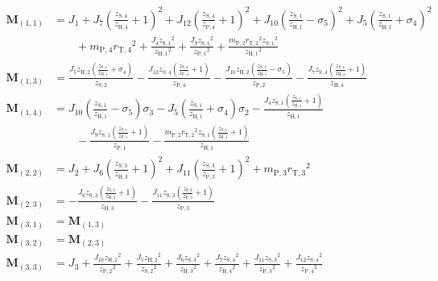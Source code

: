 \begin{align*}
	\pmb{M}_{(1,1)} &=  J_1+J_7\left(\frac{z_\mathrm{S,4}}{z_\mathrm{H,4}}+1\right)^2+J_{12} \left(\frac{z_\mathrm{S,4}}{z_\mathrm{P,4}}+1\right)^2+J_{10} {\left(\frac{z_\mathrm{S,1}}{z_\mathrm{H,1}} - \sigma_{5}\right)}^2+J_{5} \left(\frac{z_\mathrm{S,1}}{z_\mathrm{H,1}}+\sigma_{4}\right)^2 \\
		&\qquad + m_\mathrm{P,4} {r_\mathrm{T,4}}^2+\frac{J_{4} {z_\mathrm{S,1}}^2}{{z_\mathrm{H,1}}^2}+\frac{J_{9} {z_\mathrm{S,1}}^2}{{z_\mathrm{P,1}}^2}+\frac{m_\mathrm{P,2} {r_\mathrm{T,2}}^2 {z_\mathrm{S,1}}^2}{{z_\mathrm{H,1}}^2}\\
	\pmb{M}_{(1,3)} &= \frac{J_{5} z_\mathrm{H,2} \left(\frac{z_\mathrm{S,1}}{z_\mathrm{H,1}}+\sigma_{4}\right)}{z_\mathrm{S,2}}-\frac{J_{12} z_\mathrm{S,4} \left(\frac{z_\mathrm{S,4}}{z_\mathrm{P,4}}+1\right)}{z_\mathrm{P,4}}-\frac{J_{10} z_\mathrm{H,2} \left(\frac{z_\mathrm{S,1}}{z_\mathrm{H,1}} - \sigma_{5}\right)}{z_\mathrm{P,2}}-\frac{J_{7} z_\mathrm{S,4} \left(\frac{z_\mathrm{S,4}}{z_\mathrm{H,4}}+1\right)}{z_\mathrm{H,4}}\\
	\pmb{M}_{(1,4)} &= J_{10} \left(\frac{z_\mathrm{S,1}}{z_\mathrm{H,1}}-\sigma_{5}\right) \sigma_{3} - J_{5} \left(\frac{z_\mathrm{S,1}}{z_\mathrm{H,1}}+\sigma_{4}\right) \sigma_{2} -\frac{J_{4} z_\mathrm{S,1} \left(\frac{z_\mathrm{S,1}}{z_\mathrm{H,1}}+1\right)}{z_\mathrm{H,1}}\\
		&\qquad-\frac{J_{9} z_\mathrm{S,1} \left(\frac{z_\mathrm{S,1}}{z_\mathrm{P,1}}+1\right)}{z_\mathrm{P,1}}-\frac{m_\mathrm{P,2} {r_\mathrm{T,2}}^2 z_\mathrm{S,1} \left(\frac{z_\mathrm{S,1}}{z_\mathrm{H,1}}+1\right)}{z_\mathrm{H,1}}\\
	\pmb{M}_{(2,2)} &= J_2+J_6 \left(\frac{z_\mathrm{S,3}}{z_\mathrm{H,3}}+1\right)^2+J_{11} \left(\frac{z_\mathrm{S,3}}{z_\mathrm{P,3}}+1\right)^2+m_\mathrm{P,3} {r_\mathrm{T,3}}^2\\
	\pmb{M}_{(2,3)} &= -\frac{J_{6} z_\mathrm{S,3} \left(\frac{z_\mathrm{S,3}}{z_\mathrm{H,3}}+1\right)}{z_\mathrm{H,3}}-\frac{J_{11} z_\mathrm{S,3} \left(\frac{z_\mathrm{S,3}}{z_\mathrm{P,3}}+1\right)}{z_\mathrm{P,3}}\\
	\pmb{M}_{(3,1)} &= \pmb{M}_{(1,3)}\\
	\pmb{M}_{(3,2)} &= \pmb{M}_{(2,3)}\\
	\pmb{M}_{(3,3)} &= J_{3}+\frac{J_{10} {z_\mathrm{H,2}}^2}{{z_\mathrm{P,2}}^2}+\frac{J_{5} {z_\mathrm{H,2}}^2}{{z_\mathrm{S,2}}^2}+\frac{J_{6} {z_\mathrm{S,3}}^2}{{z_\mathrm{H,3}}^2}+\frac{J_{7} {z_\mathrm{S,4}}^2}{{z_\mathrm{H,4}}^2}+\frac{J_{11} {z_\mathrm{S,3}}^2}{{z_\mathrm{P,3}}^2}+\frac{J_{12} {z_\mathrm{S,4}}^2}{{z_\mathrm{P,4}}^2} \\

\end{align*}
